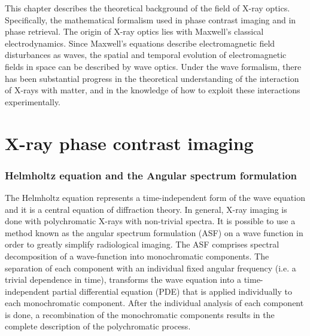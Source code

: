 \documentclass[10pt, a4paper, singlespacing]{report}
\begin{document}
This chapter describes the theoretical background of the field of X-ray optics. Specifically, the mathematical formalism used in phase contrast imaging and in phase retrieval. The origin of X-ray optics lies with Maxwell's classical electrodynamics\cite{PagsTutes}. Since Maxwell's equations describe electromagnetic field disturbances as waves, the spatial and temporal evolution of electromagnetic ﬁelds in space can be described by wave optics. Under the wave formalism, there has been substantial progress in the theoretical understanding of the interaction of X-rays with matter, and in the knowledge of how to exploit these interactions experimentally.
\section{X-ray phase contrast imaging}\label{PC}

\subsubsection{Helmholtz equation and the Angular spectrum formulation}\label{ASF}

The Helmholtz equation represents a time-independent form of the wave equation and it is a central equation of diffraction theory\cite{CH49}\cite{Pags2006}.
In general, X-ray imaging is done with polychromatic X-rays with non-trivial spectra\cite{CH49}. It is possible to use a method known as the angular spectrum formulation (ASF) on a wave function in order to greatly simplify radiological imaging. The ASF comprises spectral decomposition of a wave-function into monochromatic components. The separation of each component with an individual fixed angular frequency (i.e. a trivial dependence in time), transforms the wave equation into a time-independent partial differential equation (PDE) that is applied individually to each monochromatic component. After the individual analysis of each component is done, a recombination of the monochromatic components results in the complete description of the polychromatic process\cite{CH49}\cite{Pags2006}.
\end{document}
